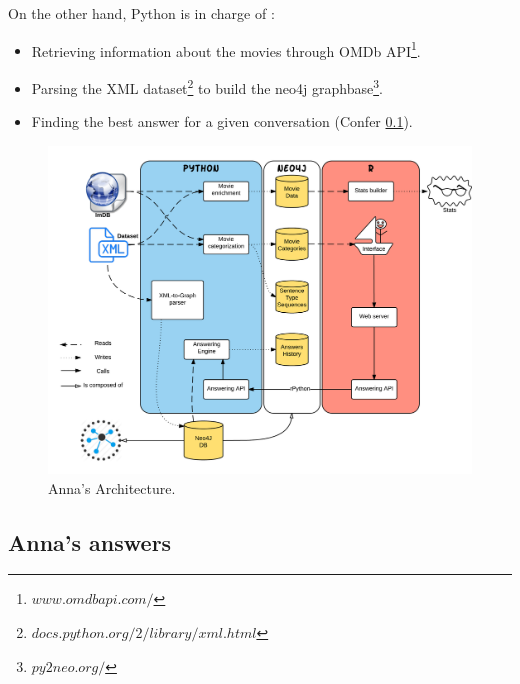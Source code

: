 On the other hand, Python is in charge of :
\begin{itemize}
    \item Retrieving information about the movies through OMDb API\footnote{$www.omdbapi.com/$}.
    \item Parsing the XML dataset\footnote{$docs.python.org/2/library/xml.html$} to build the neo4j graphbase\footnote{$py2neo.org/$}.
    \item Finding the best answer for a given conversation (Confer \ref{sub:Answering}).
\end{itemize}

\begin{figure}[!h]
\begin{center}
\includegraphics[width=1.1\textwidth]{./img/Archi.png}
\end{center}
\caption{Anna's Architecture.}
\label{fig:Archi}
\end{figure}

%
\subsection{Anna's answers}
\label{sub:Answering}

